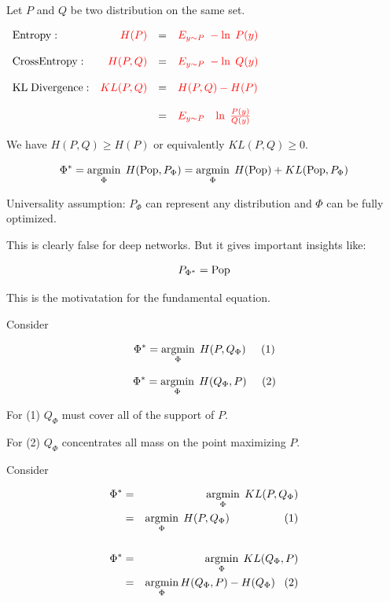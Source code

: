 {

Let $P$ and $Q$ be two distribution on the same set.

\vfill
\centerline{
  $\begin{array}{lrcl}
\mathrm{Entropy}: & {\color{red} H(P)} & = & {\color{red} E_{y \sim P}\;-\ln\;P(y)} \\
\\
\mathrm{Cross Entropy:} & {\color{red} H(P,Q)} & = & {\color{red} E_{y \sim P}\;-\ln\;Q(y)} \\
\\
\mathrm{KL\; Divergence:} & {\color{red} KL(P,Q)} & = & {\color{red} H(P,Q) - H(P)} \\
\\
& & = & {\color{red} E_{y \sim P}\;\;\; \ln\;\frac{P(y)}{Q(y)}}
\end{array}$}

\vfill
We have {\color{red} $H(P,Q) \geq H(P)$} or equivalently {\color{red} $KL(P,Q) \geq 0$}.


{\color{red} $$\Phi^* = \operatorname*{argmin}_\Phi\;H(\mathrm{Pop},P_\Phi) = \operatorname*{argmin}_\Phi\;H(\mathrm{Pop}) + KL(\mathrm{Pop},P_\Phi)$$}

\vfill
Universality assumption: {\color{red} $P_\Phi$ can represent any distribution and $\Phi$ can be fully optimized.}

\vfill
This is clearly false for deep networks.  {\color{red} But it gives important insights like:}

{\color{red} $$P_{\Phi^*} = \mathrm{Pop}$$}

\vfill
{\color{red} \centerline{This is the motivatation for the fundamental equation.}}


Consider 


$$\Phi^* = \operatorname*{argmin}_\Phi \;H(P,Q_\Phi)\;\;\;\;\;(1)$$

\vfill
$$\Phi^* = \operatorname*{argmin}_\Phi \;H(Q_\Phi,P)\;\;\;\;\;(2)$$

\vfill
For (1) $Q_\Phi$ must cover all of the support of $P$.

\vfill
For (2) $Q_\Phi$ concentrates all mass on the point maximizing $P$.

    
Consider 


\begin{eqnarray*}
  \Phi^* & = & \operatorname*{argmin}_\Phi \;KL(P,Q_\Phi) \\
  & = & \operatorname*{argmin}_\Phi\; H(P,Q_\Phi)\;\;\;\;\;\;\;\;\;\;\;\;\;\;\;\;\;\;(1) \\
  \\
  \Phi^* & = & \operatorname*{argmin}_\Phi \;KL(Q_\Phi,P) \\
  & = & \operatorname*{argmin}_\Phi H(Q_\Phi,P) - H(Q_\Phi)\;\;\;(2)
  \end{eqnarray*}

}

